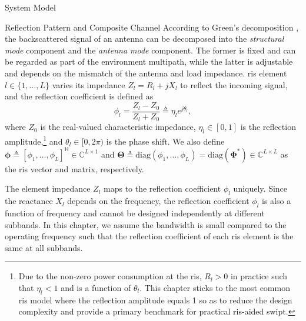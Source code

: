 \begin{section}{System Model}
	\begin{subsection}{Reflection Pattern and Composite Channel}
		According to Green's decomposition \cite{Hansen1989}, the backscattered signal of an antenna can be decomposed into the \emph{structural mode} component and the \emph{antenna mode} component. The former is fixed and can be regarded as part of the environment multipath, while the latter is adjustable and depends on the mismatch of the antenna and load impedance. \gls{ris} element $l \in \{1, \dots, L\}$ varies its impedance $Z_l = R_l + j X_l$ to reflect the incoming signal, and the reflection coefficient is defined as
		\begin{equation}
			\phi_l = \frac{Z_l - Z_0}{Z_l + Z_0} \triangleq \eta_l e^{j\theta_l},
		\end{equation}
		where $Z_0$ is the real-valued characteristic impedance, $\eta_l \in [0, 1]$ is the reflection amplitude,\footnote{Due to the non-zero power consumption at the \gls{ris}, $R_l > 0$ in practice such that $\eta_l < 1$ and is a function of $\theta_l$. This chapter sticks to the most common \gls{ris} model where the reflection amplitude equals \num{1} so as to reduce the design complexity and provide a primary benchmark for practical \gls{ris}-aided \gls{swipt}.} and $\theta_l \in [0,2\pi)$ is the phase shift. We also define $\mathbf{\phi} \triangleq [\phi_1, \dots, \phi_L]^\mathsf{H} \in \mathbb{C}^{L \times 1}$ and $\mathbf{\Theta} \triangleq \mathrm{diag}(\phi_1, \dots, \phi_L)=\mathrm{diag}(\mathbf{\Phi}^*) \in \mathbb{C}^{L \times L}$ as the \gls{ris} vector and matrix, respectively.

		\begin{remark}\label{re:reflection_coefficient}
			The element impedance $Z_l$ maps to the reflection coefficient $\phi_l$ uniquely. Since the reactance $X_l$ depends on the frequency, the reflection coefficient $\phi_l$ is also a function of frequency and cannot be designed independently at different subbands. In this chapter, we assume the bandwidth is small compared to the operating frequency such that the reflection coefficient of each \gls{ris} element is the same at all subbands.
		\end{remark}


\end{subsection}
\end{section}
